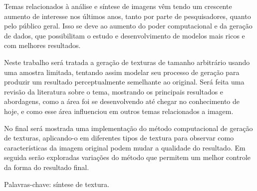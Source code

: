\setlength{\absparsep}{18pt} 
\begin{resumo}[Resumo]
 
Temas relacionados à análise e síntese de imagens vêm
tendo um crescente aumento de interesse nos últimos anos,
tanto por parte de pesquisadores, quanto pelo público geral.
Isso se deve ao aumento do poder computacional e da
geração de dados, que possibilitam o estudo e desenvolvimento
de modelos mais ricos e com melhores resultados.

Neste trabalho será tratada a geração de texturas de
tamanho arbitrário usando uma amostra limitada,
tentando assim modelar seu processo de geração para
produzir um resultado perceptualmente semelhante
ao original. Será feita uma revisão da literatura
sobre o tema, mostrando os principais resultados e
abordagens, como a área foi se desenvolvendo até
chegar no conhecimento de hoje, e como esse área
influenciou em outros temas relacionados a imagem.

No final será mostrada uma implementação do método
computacional de geração de texturas, aplicando-o
em diferentes tipos de textura para observar como
características da imagem original podem mudar a
qualidade do resultado. Em seguida serão exploradas
variações do método que permitem um melhor controle
da forma do resultado final.


 Palavras-chave: síntese de textura.
\end{resumo}

%

